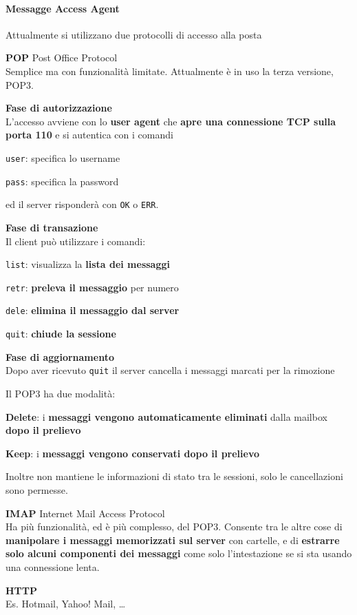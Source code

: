\documentclass[10pt]{article}
\begin{document}
\paragraph{Messagge Access Agent} Attualmente si utilizzano due protocolli di accesso alla posta
\begin{list}{}{}
\item \textbf{POP}  Post Office Protocol\\Semplice ma con funzionalità limitate. Attualmente è in uso la terza versione, POP3.
\begin{list}{}{}
\item \textbf{Fase di autorizzazione}\\L'accesso avviene con lo \textbf{user agent} che \textbf{apre una connessione TCP sulla porta 110} e si autentica con i comandi
\begin{list}{}{}
\item \texttt{user}: specifica lo username
\item \texttt{pass}: specifica la password
\end{list}
ed il server risponderà con \texttt{OK} o \texttt{ERR}.
\pagebreak
\item \textbf{Fase di transazione}\\Il client può utilizzare i comandi:
\begin{list}{}{}
\item \texttt{list}: visualizza la \textbf{lista dei messaggi}
\item \texttt{retr}: \textbf{preleva il messaggio} per numero
\item \texttt{dele}: \textbf{elimina il messaggio dal server}
\item \texttt{quit}: \textbf{chiude la sessione}
\end{list}
\item \textbf{Fase di aggiornamento}\\Dopo aver ricevuto \texttt{quit} il server cancella i messaggi marcati per la rimozione
\end{list}
Il POP3 ha due modalità:
\begin{list}{}{}
\item \textbf{Delete}: i \textbf{messaggi vengono automaticamente eliminati} dalla mailbox \textbf{dopo il  prelievo}
\item \textbf{Keep}: i \textbf{messaggi vengono conservati dopo il prelievo}
\end{list}
Inoltre non mantiene le informazioni di stato tra le sessioni, solo le cancellazioni sono permesse.
\item \textbf{IMAP}  Internet Mail Access Protocol\\
Ha più funzionalità, ed è più complesso, del POP3. Consente tra le altre cose di \textbf{manipolare i messaggi memorizzati sul server} con cartelle, e di \textbf{estrarre solo alcuni componenti dei messaggi} come solo l'intestazione se si sta usando una connessione lenta.
\item \textbf{HTTP}\\Es. Hotmail, Yahoo! Mail, \ldots
\end{list}
\end{document}
